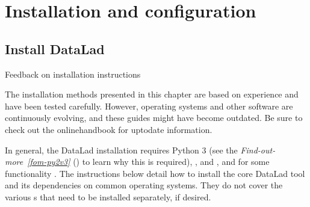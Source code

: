 \chapter{Installation and configuration}
\label{\detokenize{intro/installation:installation-and-configuration}}\label{\detokenize{intro/installation:install}}\label{\detokenize{intro/installation::doc}}

\ignorespaces 

\section{Install DataLad}
\label{\detokenize{intro/installation:install-datalad}}\label{\detokenize{intro/installation:index-0}}\begin{importantnote}[before title={\thetcbcounter\ }, check odd page=true]{Feedback on installation instructions}

\sphinxAtStartPar
The installation methods presented in this chapter are based on experience
and have been tested carefully. However, operating systems and other
software are continuously evolving, and these guides might have become
outdated. Be sure to check out the online\sphinxhyphen{}handbook for up\sphinxhyphen{}to\sphinxhyphen{}date information.


\end{importantnote}

\sphinxAtStartPar
In general, the DataLad installation requires Python 3 (see the
\textit{Find-out-more}~{\findoutmoreiconinline}\textit{\ref{fom-py2v3}} {\hyperref[\detokenize{intro/installation:fom-py2v3}]{}} () to learn
why this is required), {\hyperref[\detokenize{glossary:term-Git}]{}}, and {\hyperref[\detokenize{glossary:term-git-annex}]{}}, and for some
functionality .  The instructions below detail how
to install the core DataLad tool and its dependencies on common operating
systems. They do not cover the various {\hyperref[\detokenize{glossary:term-DataLad-extension}]{}}s that need to be installed separately, if desired.

